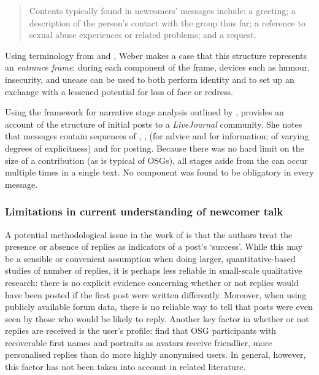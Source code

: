 \begin{quote}\small\singlespacing
Contents typically found in newcomers' messages include: a greeting; a description of the person's contact with the group thus far; a reference to sexual abuse experiences or related problems; and a request.
\end{quote}
%
Using terminology from \textcite{goffman_presentation_1959} and \textcite{brown_politeness:_1987}, Weber makes a case that this structure represents an \emph{entrance frame}: during each component of the frame, devices such as humour, insecurity, and unease can be used to both perform identity and to set up an exchange with a lessened potential for loss of face or redress. 

Using the framework for narrative stage analysis outlined by \textcite{labov_narrative_1997}, \textcite{kouper_pragmatics_2010} provides an account of the structure of initial \glspl{post} to a \emph{LiveJournal} community. She notes that messages contain sequences of , ,  (for advice and for information; of varying degrees of explicitness) and  for posting. Because there was no hard limit on the size of a contribution (as is typical of \glspl{OSG}), all stages aside from the  can occur multiple times in a single text. No component was found to be obligatory in every message.


\subsubsection{Limitations in current understanding of newcomer talk} \label{sect:limit-newcomer}

A potential methodological issue in the work of \textcite{horne_doing_2009}  is that the authors treat the presence or absence of replies as indicators of a \gls{post}'s `success'. While this may be a sensible or convenient assumption when doing larger, quantitative\hyp{}based studies of number of replies, it is perhaps less reliable in small\hyp{}scale qualitative research: there is no explicit evidence concerning whether or not replies would have been posted if the first \gls{post} were written differently. Moreover, when using publicly available \gls{forum} data, there is no reliable way to tell that \glspl{post} were even seen by those who would be likely to reply. Another key factor in whether or not replies are received is the user's profile: \textcite{feng_is_2016} find that \gls{OSG} participants with recoverable first names and portraits as avatars receive friendlier, more personalised replies than do more highly anonymised users. In general, however, this factor has not been taken into account in related literature.

